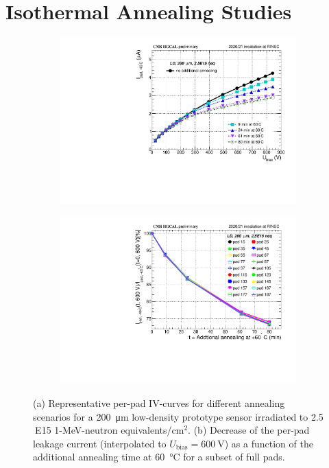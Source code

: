 \section{Isothermal Annealing Studies}
\label{sec:annealing}

\begin{figure}
	\captionsetup[subfigure]{aboveskip=-1pt,belowskip=-1pt}
	\centering
	\begin{subfigure}[b]{0.49\textwidth}
		\includegraphics[width=0.999\textwidth]{plots/annealing_iv/annealing_IV_ch24.pdf}
		\subcaption{
		}
		\label{plot:annealing_IV}
	\end{subfigure}
	\hfill
	\begin{subfigure}[b]{0.49\textwidth}
		\includegraphics[width=0.999\textwidth]{plots/annealing_iv/annealing_current.pdf}
		\subcaption{
		}
		\label{plot:annealing_current}
	\end{subfigure}
	\caption{
		(a) Representative per-pad IV-curves for different annealing scenarios for a \SI{200}{\micro\metre} low-density prototype sensor irradiated to 2.5$~$E15 1-MeV-neutron equivalents/cm$^{2}$.
        (b) Decrease of the per-pad leakage current (interpolated to $U_\text{bias}=\SI{600}{\volt}$) as a function of the additional annealing time at \SI{60}{\celsius} for a subset of full pads.
	}
\end{figure}

